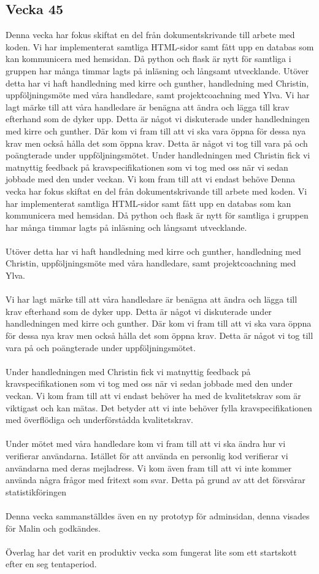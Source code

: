 \documentclass[12pt]{article}
\begin{document}
    \subsection{Vecka 45}
 Denna vecka har fokus skiftat en del från dokumentskrivande till arbete med koden. Vi har implementerat samtliga HTML-sidor  samt fått upp en databas som kan kommunicera med hemsidan. Då python och flask är nytt för samtliga i gruppen har många timmar lagts på inläsning och långsamt utvecklande.   Utöver detta har vi haft handledning med kirre och gunther, handledning med Christin, uppföljningsmöte med våra handledare, samt projektcoachning med Ylva.  Vi har lagt märke till att våra handledare är benägna att ändra och lägga till krav efterhand som de dyker upp. Detta är något vi diskuterade  under handledningen med kirre och gunther. Där kom vi fram till att vi ska vara öppna för dessa nya krav men också hålla det som öppna krav. Detta är något vi tog till vara på och poängterade under uppföljningsmötet.  Under handledningen med Christin fick vi matnyttig feedback på kravspecifikationen som vi tog med oss när vi sedan jobbade med den under veckan. Vi kom fram till att vi endast behöve
Denna vecka har fokus skiftat en del från dokumentskrivande till arbete med koden. Vi har implementerat samtliga HTML-sidor 
samt fått upp en databas som kan kommunicera med hemsidan. Då python och flask är nytt för samtliga i gruppen har många timmar lagts på
inläsning och långsamt utvecklande. 
\\
\\
Utöver detta har vi haft handledning med kirre och gunther, handledning med Christin, uppföljningsmöte med våra handledare, samt projektcoachning med Ylva.
\\
\\
Vi har lagt märke till att våra handledare är benägna att ändra och lägga till krav efterhand som de dyker upp. Detta är något vi diskuterade 
under handledningen med kirre och gunther. Där kom vi fram till att vi ska vara öppna för dessa nya krav men också hålla det som öppna krav.
Detta är något vi tog till vara på och poängterade under uppföljningsmötet.
\\
\\
Under handledningen med Christin fick vi matnyttig feedback på kravspecifikationen som vi tog med oss när vi sedan jobbade med den under veckan.
Vi kom fram till att vi endast behöver ha med de kvalitetskrav som är viktigast och kan mätas. Det betyder att vi inte behöver fylla 
kravspecifikationen med överflödiga och underförstådda kvalitetskrav.
\\
\\
Under mötet med våra handledare kom vi fram till att vi ska ändra hur vi verifierar användarna. Istället för att använda en personlig kod verifierar vi användarna
med deras mejladress. Vi kom även fram till att vi inte kommer använda några frågor med fritext som svar. Detta på grund av att det försvårar statistikföringen
\\
\\
Denna vecka sammanställdes även en ny prototyp för adminsidan, denna visades för Malin och godkändes.
\\
\\
Överlag har det varit en produktiv vecka som fungerat lite som ett startskott efter en seg tentaperiod.
\end{document}
